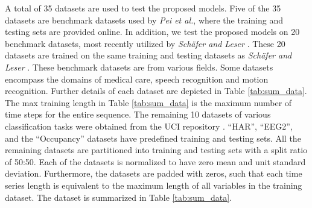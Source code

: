 \documentclass[preprint,12pt,3p]{elsarticle}
\begin{document}
\begin{table}[]
\end{table} A total of 35 datasets are used to test the proposed models. Five of the 35 datasets are benchmark datasets used by \textit{Pei et al.}\cite{pei2017multivariate}, where the training and testing sets are provided online. In addition, we test the proposed models on 20 benchmark datasets, most recently utilized by \textit{Sch\"{a}fer and Leser} \cite{schafer2017multivariate}. These 20 datasets are trained on the same training and testing datasets as \textit{Sch\"{a}fer and Leser} \cite{schafer2017multivariate}. These benchmark datasets are from various fields. Some datasets encompass the domains of medical care, speech recognition and motion recognition. Further details of each dataset are depicted in Table \ref{tab:sum_data}. The max training length in Table \ref{tab:sum_data} is the maximum number of time steps for the entire sequence. The remaining 10 datasets of various classification tasks were obtained from the UCI repository \cite{Lichman:2013}. ``HAR'', ``EEG2'', and the ``Occupancy'' datasets have predefined training and testing sets. All the remaining datasets are partitioned into training and testing sets with a split ratio of 50:50. Each of the datasets is normalized to have zero mean and unit standard deviation. Furthermore, the datasets are padded with zeros, such that each time series length is equivalent to the maximum length of all variables in the training dataset. The dataset is summarized in Table \ref{tab:sum_data}.
















































 
\end{document}
